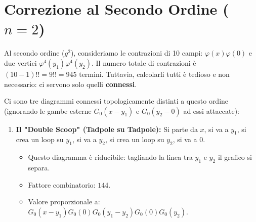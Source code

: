\section{Correzione al Secondo Ordine ($n=2$)}

Al secondo ordine ($g^2$), consideriamo le contrazioni di 10 campi: $\varphi(x)\varphi(0)$ e due vertici $\varphi^4(y_1)\varphi^4(y_2)$.
Il numero totale di contrazioni è $(10-1)!! = 9!! = 945$ termini.
Tuttavia, calcolarli tutti è tedioso e non necessario: ci servono solo quelli \textbf{connessi}.

Ci sono tre diagrammi connessi topologicamente distinti a questo ordine (ignorando le gambe esterne $G_0(x-y_1)$ e $G_0(y_2-0)$ ad essi attaccate):

\begin{enumerate}
    \item \textbf{Il "Double Scoop" (Tadpole su Tadpole):}
    Si parte da $x$, si va a $y_1$, si crea un loop su $y_1$, si va a $y_2$, si crea un loop su $y_2$, si va a $0$.
   
    \begin{itemize}
        \item Questo diagramma è riducibile: tagliando la linea tra $y_1$ e $y_2$ il grafico si separa.
        \item Fattore combinatorio: $144$.
        \item Valore proporzionale a: $G_0(x-y_1)G_0(0) G_0(y_1-y_2) G_0(0) G_0(y_2)$.
    \end{itemize}

    \begin{center}
\end{center}
\end{enumerate}

